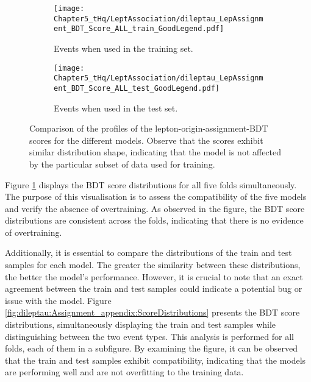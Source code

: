  \begin{figure}[htbp!]
	\begin{subfigure}[h]{0.45\linewidth}
		\texttt{[image: Chapter5\_tHq/LeptAssociation/dileptau\_LepAssignment\_BDT\_Score\_ALL\_train\_GoodLegend.pdf]}
		\caption{Events when used in the training set.}
	\end{subfigure}
	\hfill
	\begin{subfigure}[h]{0.45\linewidth}
		\texttt{[image: Chapter5\_tHq/LeptAssociation/dileptau\_LepAssignment\_BDT\_Score\_ALL\_test\_GoodLegend.pdf]}
		\caption{Events when used in the test set.}
	\end{subfigure}%
	\caption{Comparison of the profiles of the lepton-origin-assignment-BDT scores for the different models. 
	Observe that the scores exhibit similar distribution shape, indicating that 
	the model is not affected by the particular subset of data used for training.}
	\label{fig:ChaptH:dileptau:Assignment:ScoreDistributions}
\end{figure}

Figure \ref{fig:ChaptH:dileptau:Assignment:ScoreDistributions} displays the BDT 
score distributions for all five folds simultaneously. The purpose of this visualisation 
is to assess the compatibility of the five models and verify the absence of overtraining. 
As observed in the figure, the BDT score distributions are consistent across the folds, 
indicating that there is no evidence of overtraining.


Additionally, it is essential to compare the distributions of the train and test 
samples for each model. The greater the similarity between these distributions, 
the better the model's performance. However, it is crucial to note that an exact 
agreement between the train and test samples could indicate a potential bug or 
issue with the model.
Figure \ref{fig:dileptau:Assignment_appendix:ScoreDistributions} presents the 
BDT score distributions, simultaneously displaying the train and test samples 
while distinguishing between the two event types. This analysis is performed 
for all folds, each of them in a subfigure. By examining the figure, it can be 
observed that the train and test samples exhibit compatibility, indicating that the 
models are performing well and are not overfitting to the training data.


